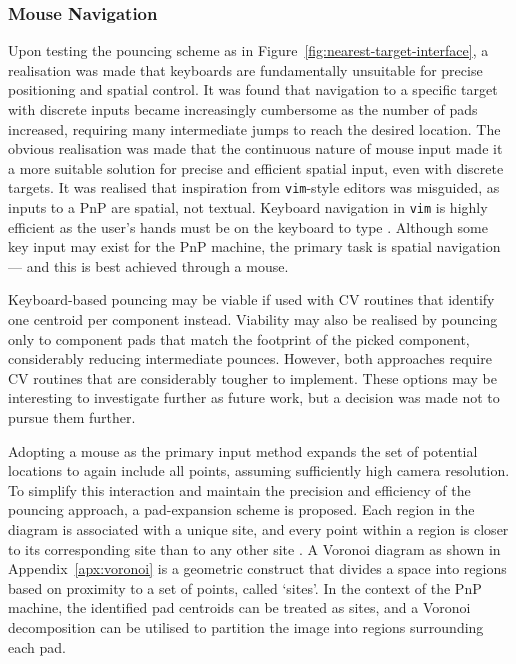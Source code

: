 \documentclass[12pt,british,UKenglish]{article}
\begin{document}
\subsubsection{Mouse Navigation}

Upon testing the pouncing scheme as in Figure~\ref{fig:nearest-target-interface}, a realisation was made that keyboards are fundamentally unsuitable for precise positioning and spatial control.
It was found that navigation to a specific target with discrete inputs became increasingly cumbersome as the number of pads increased, requiring many intermediate jumps to reach the desired location.
The obvious realisation was made that the continuous nature of mouse input made it a more suitable solution for precise and efficient spatial input, even with discrete targets.
It was realised that inspiration from \texttt{vim}-style editors was misguided, as inputs to a \ac{PnP} are spatial, not textual.
Keyboard navigation in \texttt{vim} is highly efficient as the user's hands must be on the keyboard to type \cite{10.31510/infa.v17i2.1066}.
Although some key input may exist for the \ac{PnP} machine, the primary task is spatial navigation --- and this is best achieved through a mouse.

Keyboard-based pouncing may be viable if used with \ac{CV} routines that identify one centroid per component instead.
Viability may also be realised by pouncing only to component pads that match the footprint of the picked component, considerably reducing intermediate pounces.
However, both approaches require \ac{CV} routines that are considerably tougher to implement.
These options may be interesting to investigate further as future work, but a decision was made not to pursue them further.

Adopting a mouse as the primary input method expands the set of potential locations to again include all points, assuming sufficiently high camera resolution.
To simplify this interaction and maintain the precision and efficiency of the pouncing approach, a pad-expansion scheme is proposed.
Each region in the diagram is associated with a unique site, and every point within a region is closer to its corresponding site than to any other site \cite{10024454}.
A Voronoi diagram as shown in Appendix~\ref{apx:voronoi} is a geometric construct that divides a space into regions based on proximity to a set of points, called `sites'.
In the context of the \ac{PnP} machine, the identified pad centroids can be treated as sites, and a Voronoi decomposition can be utilised to partition the image into regions surrounding each pad.
\end{document}
